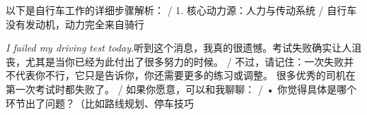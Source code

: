 \begin{multicols}{2}
以\allowbreak{}下\allowbreak{}是\allowbreak{}自\allowbreak{}行\allowbreak{}车\allowbreak{}工\allowbreak{}作\allowbreak{}的\allowbreak{}详\allowbreak{}细\allowbreak{}步\allowbreak{}骤\allowbreak{}解\allowbreak{}析\allowbreak{}：\allowbreak{} / 1. 核\allowbreak{}心\allowbreak{}动\allowbreak{}力\allowbreak{}源\allowbreak{}：\allowbreak{}人\allowbreak{}力\allowbreak{}与\allowbreak{}传\allowbreak{}动\allowbreak{}系\allowbreak{}统\allowbreak{} / 自\allowbreak{}行\allowbreak{}车\allowbreak{}没\allowbreak{}有\allowbreak{}发\allowbreak{}动\allowbreak{}机\allowbreak{}，\allowbreak{}动\allowbreak{}力\allowbreak{}完\allowbreak{}全\allowbreak{}来\allowbreak{}自\allowbreak{}骑\allowbreak{}行\allowbreak{}\par\noindent\textit{I failed my driving test today.}\enspace 听\allowbreak{}到\allowbreak{}这\allowbreak{}个\allowbreak{}消\allowbreak{}息\allowbreak{}，\allowbreak{}我\allowbreak{}真\allowbreak{}的\allowbreak{}\allowbreak{}很\allowbreak{}遗\allowbreak{}憾\allowbreak{}。\allowbreak{}考\allowbreak{}试\allowbreak{}失\allowbreak{}败\allowbreak{}确\allowbreak{}实\allowbreak{}\allowbreak{}让\allowbreak{}人\allowbreak{}沮\allowbreak{}丧\allowbreak{}，\allowbreak{}尤\allowbreak{}其\allowbreak{}是\allowbreak{}当\allowbreak{}你\allowbreak{}\allowbreak{}已\allowbreak{}经\allowbreak{}为\allowbreak{}此\allowbreak{}付\allowbreak{}出\allowbreak{}了\allowbreak{}很\allowbreak{}多\allowbreak{}努\allowbreak{}\allowbreak{}力\allowbreak{}的\allowbreak{}时\allowbreak{}候\allowbreak{}。\allowbreak{} / 不\allowbreak{}过\allowbreak{}，\allowbreak{}请\allowbreak{}记\allowbreak{}住\allowbreak{}：\allowbreak{}一\allowbreak{}次\allowbreak{}失\allowbreak{}\allowbreak{}败\allowbreak{}并\allowbreak{}不\allowbreak{}代\allowbreak{}表\allowbreak{}你\allowbreak{}不\allowbreak{}行\allowbreak{}，\allowbreak{}它\allowbreak{}\allowbreak{}只\allowbreak{}是\allowbreak{}告\allowbreak{}诉\allowbreak{}你\allowbreak{}，\allowbreak{}你\allowbreak{}还\allowbreak{}需\allowbreak{}要\allowbreak{}\allowbreak{}更\allowbreak{}多\allowbreak{}的\allowbreak{}练\allowbreak{}习\allowbreak{}或\allowbreak{}调\allowbreak{}整\allowbreak{}。\allowbreak{} 很\allowbreak{}多\allowbreak{}优\allowbreak{}秀\allowbreak{}的\allowbreak{}司\allowbreak{}机\allowbreak{}在\allowbreak{}第\allowbreak{}一\allowbreak{}次\allowbreak{}考\allowbreak{}试\allowbreak{}时\allowbreak{}都\allowbreak{}失\allowbreak{}败\allowbreak{}了\allowbreak{}。\allowbreak{} / 如\allowbreak{}果\allowbreak{}你\allowbreak{}愿\allowbreak{}意\allowbreak{}，\allowbreak{}可\allowbreak{}以\allowbreak{}和\allowbreak{}我\allowbreak{}聊\allowbreak{}聊\allowbreak{}：\allowbreak{} / • 你\allowbreak{}觉\allowbreak{}得\allowbreak{}具\allowbreak{}体\allowbreak{}是\allowbreak{}哪\allowbreak{}个\allowbreak{}环\allowbreak{}节\allowbreak{}\allowbreak{}出\allowbreak{}了\allowbreak{}问\allowbreak{}题\allowbreak{}？\allowbreak{}（\allowbreak{}比\allowbreak{}如\allowbreak{}路\allowbreak{}线\allowbreak{}\allowbreak{}规\allowbreak{}划\allowbreak{}、\allowbreak{}停\allowbreak{}车\allowbreak{}技\allowbreak{}巧\allowbreak{}\par\medskip

\end{multicols}
